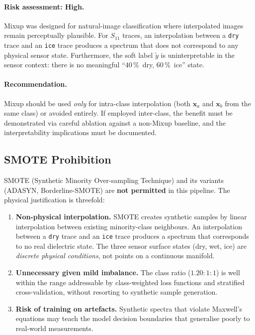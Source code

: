 \paragraph{Risk assessment: \textbf{High}.}
Mixup was designed for natural-image classification where interpolated
images remain perceptually plausible.  For $S_{11}$ traces, an
interpolation between a \texttt{dry} trace and an \texttt{ice} trace
produces a spectrum that does not correspond to any physical sensor
state.  Furthermore, the soft label $\tilde{y}$ is uninterpretable in
the sensor context: there is no meaningful ``$40\,\%$~dry,
$60\,\%$~ice'' state.

\paragraph{Recommendation.}
Mixup should be used \emph{only} for intra-class interpolation (both
$\mathbf{x}_a$ and $\mathbf{x}_b$ from the same class) or avoided
entirely.  If employed inter-class, the benefit must be demonstrated
via careful ablation against a non-Mixup baseline, and the
interpretability implications must be documented.

\subsection{SMOTE Prohibition}
\label{sec:augment:smote_prohibition}

\begin{tcolorbox}[
  colback=red!5!white,
  colframe=red!75!black,
  title={\textbf{SMOTE Is Prohibited for This Dataset}},
  fonttitle=\bfseries
]
SMOTE (Synthetic Minority Over-sampling Technique) and its variants
(ADASYN, Borderline-SMOTE) are \textbf{not permitted} in this pipeline.
The physical justification is threefold:
\begin{enumerate}
  \item \textbf{Non-physical interpolation.}  SMOTE creates synthetic
        samples by linear interpolation between existing minority-class
        neighbours.  An interpolation between a \texttt{dry} trace and
        an \texttt{ice} trace produces a spectrum that corresponds to no
        real dielectric state.  The three sensor surface states
        (dry, wet, ice) are \emph{discrete physical conditions}, not
        points on a continuous manifold.
  \item \textbf{Unnecessary given mild imbalance.}  The class ratio
        ($1.20:1:1$) is well within the range addressable by
        class-weighted loss functions and stratified cross-validation,
        without resorting to synthetic sample generation.
  \item \textbf{Risk of training on artefacts.}  Synthetic spectra that
        violate Maxwell's equations may teach the model decision
        boundaries that generalise poorly to real-world measurements.
\end{enumerate}
\end{tcolorbox}

